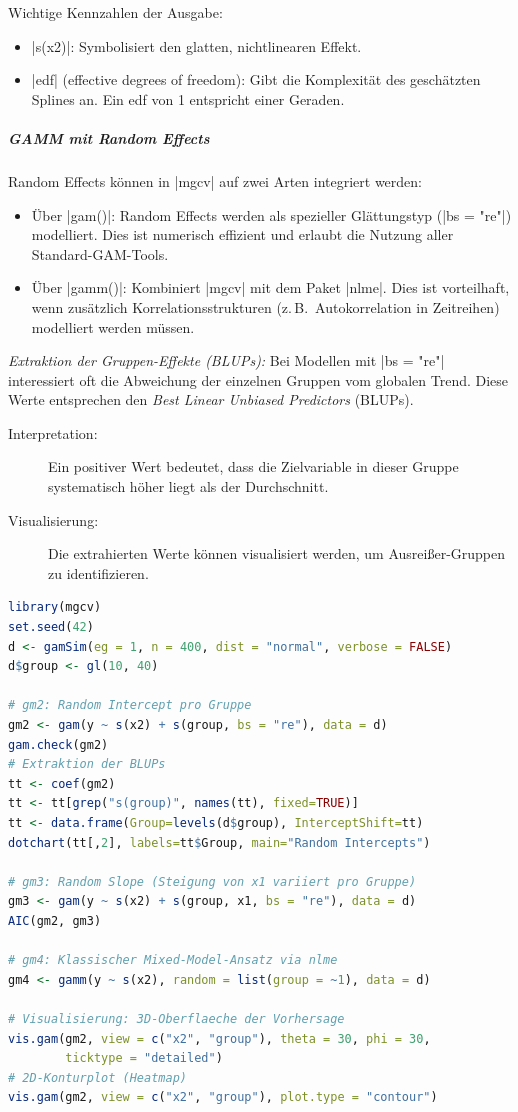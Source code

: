 \documentclass[10pt,twocolumn]{scrartcl}
\renewcommand{\lstinline}{\mycoloredinline}
\begin{document}
Wichtige Kennzahlen der Ausgabe:
\begin{itemize}
\item \lstinline|s(x2)|: Symbolisiert den glatten, nichtlinearen Effekt.
\item \lstinline|edf| (effective degrees of freedom): Gibt die Komplexität des geschätzten Splines an. Ein edf von 1 entspricht einer Geraden.
\end{itemize}


\subparagraph{GAMM mit Random Effects}

Random Effects können in \lstinline|mgcv| auf zwei Arten integriert werden:

\begin{itemize}
\item Über \lstinline|gam()|: Random Effects werden als spezieller Glättungstyp (\lstinline|bs = "re"|) modelliert. Dies ist numerisch effizient und erlaubt die Nutzung aller Standard-GAM-Tools.
\item Über \lstinline|gamm()|: Kombiniert \lstinline|mgcv| mit dem Paket \lstinline|nlme|. Dies ist vorteilhaft, wenn zusätzlich Korrelationsstrukturen (z.\,B.\ Autokorrelation in Zeitreihen) modelliert werden müssen.
\end{itemize}

\emph{Extraktion der Gruppen-Effekte (BLUPs):} Bei Modellen mit \lstinline|bs = "re"| interessiert oft die Abweichung der einzelnen Gruppen vom globalen Trend. Diese Werte entsprechen den \emph{Best Linear Unbiased Predictors} (BLUPs).

\begin{description}
\item[Interpretation:] Ein positiver Wert bedeutet, dass die Zielvariable in dieser Gruppe systematisch höher liegt als der Durchschnitt.
\item[Visualisierung:] Die extrahierten Werte können visualisiert werden, um Ausreißer-Gruppen zu identifizieren.
\end{description}

\begin{lstlisting}[language=R]
library(mgcv)
set.seed(42)
d <- gamSim(eg = 1, n = 400, dist = "normal", verbose = FALSE)
d$group <- gl(10, 40)

# gm2: Random Intercept pro Gruppe
gm2 <- gam(y ~ s(x2) + s(group, bs = "re"), data = d)
gam.check(gm2)
# Extraktion der BLUPs
tt <- coef(gm2)
tt <- tt[grep("s(group)", names(tt), fixed=TRUE)]
tt <- data.frame(Group=levels(d$group), InterceptShift=tt)
dotchart(tt[,2], labels=tt$Group, main="Random Intercepts")

# gm3: Random Slope (Steigung von x1 variiert pro Gruppe)
gm3 <- gam(y ~ s(x2) + s(group, x1, bs = "re"), data = d)
AIC(gm2, gm3)

# gm4: Klassischer Mixed-Model-Ansatz via nlme
gm4 <- gamm(y ~ s(x2), random = list(group = ~1), data = d)

# Visualisierung: 3D-Oberflaeche der Vorhersage
vis.gam(gm2, view = c("x2", "group"), theta = 30, phi = 30,
        ticktype = "detailed")
# 2D-Konturplot (Heatmap)
vis.gam(gm2, view = c("x2", "group"), plot.type = "contour")
\end{lstlisting}
\end{document}
